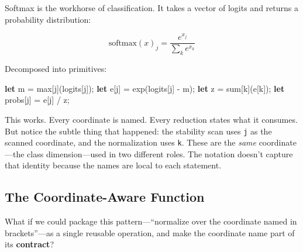 \documentclass[11pt,titlepage]{article}
\newenvironment{Shaded}{}{}
\newcommand{\KeywordTok}[1]{\textcolor[rgb]{0.00,0.44,0.13}{\textbf{#1}}}
\newcommand{\NormalTok}[1]{#1}
\newcommand{\OperatorTok}[1]{\textcolor[rgb]{0.40,0.40,0.40}{#1}}
\begin{document}
Softmax is the workhorse of classification. It takes a vector of logits
and returns a probability distribution:

\[\text{softmax}(x)_j = \frac{e^{x_j}}{\sum_k e^{x_k}}\]

Decomposed into primitives:

\begin{Shaded}
\begin{Highlighting}[]
\KeywordTok{let}\NormalTok{ m = max}\OperatorTok{[}\NormalTok{j}\OperatorTok{]}\NormalTok{(logits}\OperatorTok{[}\NormalTok{j}\OperatorTok{]}\NormalTok{);}
\KeywordTok{let}\NormalTok{ e}\OperatorTok{[}\NormalTok{j}\OperatorTok{]}\NormalTok{ = exp(logits}\OperatorTok{[}\NormalTok{j}\OperatorTok{]}\NormalTok{ - m);}
\KeywordTok{let}\NormalTok{ z = sum}\OperatorTok{[}\NormalTok{k}\OperatorTok{]}\NormalTok{(e}\OperatorTok{[}\NormalTok{k}\OperatorTok{]}\NormalTok{);}
\KeywordTok{let}\NormalTok{ probs}\OperatorTok{[}\NormalTok{j}\OperatorTok{]}\NormalTok{ = e}\OperatorTok{[}\NormalTok{j}\OperatorTok{]}\NormalTok{ / z;}
\end{Highlighting}
\end{Shaded}

This works. Every coordinate is named. Every reduction states what it
consumes. But notice the subtle thing that happened: the stability scan
uses \texttt{j} as the scanned coordinate, and the normalization uses
\texttt{k}. These are the \emph{same} coordinate---the class
dimension---used in two different roles. The notation doesn't capture
that identity because the names are local to each statement.

\vspace{2em}

\hypertarget{the-coordinate-aware-function}{%
\subsection{The Coordinate-Aware
Function}\label{the-coordinate-aware-function}}

What if we could package this pattern---``normalize over the coordinate
named in brackets''---as a single reusable operation, and make the
coordinate name part of its \textbf{contract}?
\end{document}
